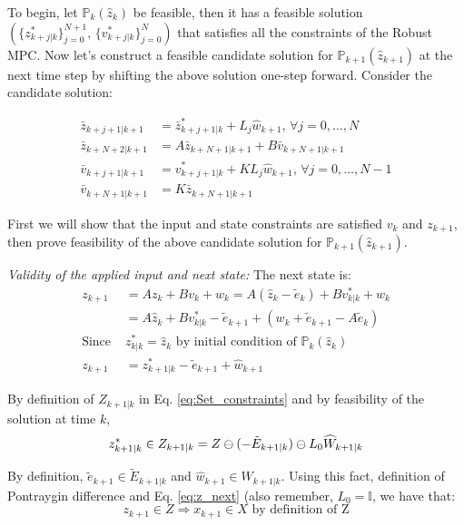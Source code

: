 To begin, let $\mathbb{P}_{k}(\hat{z}_k)$ be feasible, then it has a feasible solution $(\lbrace z^{*}_{k+j|k}\rbrace_{j=0}^{N+1}, \, \lbrace v^{*}_{k+j|k}\rbrace_{j=0}^{N} )$ that satisfies all the constraints of the Robust MPC. Now let's construct a feasible candidate solution for $\mathbb{P}_{k+1}(\hat{z}_{k+1})$ at the next time step by shifting the above solution one-step forward. Consider the candidate solution:

\begin{subequations}
\begin{align}
\label{eq:candidate}
\bar{z}_{k+j+1|k+1} &= \bar{z}^{*}_{k+j+1|k} + L_j\hat{w}_{k+1}, \, \forall j =0,\dotsc,N \\
\bar{z}_{k+N+2|k+1}&= A\bar{z}_{k+N+1|k+1} + B\bar{v}_{k+N+1|k+1} \\
\bar{v}_{k+j+1|k+1}&=v^{*}_{k+j+1|k} + KL_j\hat{w}_{k+1}, \, \forall j =0,\dotsc,N-1 \\
\bar{v}_{k+N+1|k+1}&=K\bar{z}_{k+N+1|k+1} 
\end{align}
\end{subequations}

First we will show that the input and state constraints are satisfied $v_k$ and $z_{k+1}$, then prove feasibility of the above candidate solution for $\mathbb{P}_{k+1}(\hat{z}_{k+1})$.

\textit{Validity of the applied input and next state:}
The next state is:
\begin{subequations}
\begin{align}
\label{eq:z_next}
z_{k+1} &= Az_k + Bv_k + w_k = A(\hat{z}_k-\tilde{e}_k)+Bv^{*}_{k|k}+w_k \\
 &= A\hat{z}_k+Bv^{*}_{k|k}-\tilde{e}_{k+1}+(w_k+\tilde{e}_{k+1}-A\tilde{e}_k) \\
\text{Since }& z^{*}_{k|k}=\hat{z}_k \text{ by initial condition of } \mathbb{P}_{k}(\hat{z}_k) \nonumber \\
z_{k+1}&= z^{*}_{k+1|k} - \tilde{e}_{k+1} + \hat{w}_{k+1}
\end{align}
\end{subequations}

By definition of $Z_{k+1|k}$ in Eq. \ref{eq:Set_constraints} and by feasibility of the solution at time $k$,
\begin{equation}
z^{*}_{k+1|k} \in Z_{k+1|k} = Z \ominus (-\tilde{E}_{k+1|k}) \ominus L_0\widehat{W}_{k+1|k}
\end{equation}

By definition, $\tilde{e}_{k+1} \in \tilde{E}_{k+1|k}$ and $\hat{w}_{k+1} \in  W_{k+1|k}$. Using this fact, definition of Pontraygin difference and Eq. \ref{eq:z_next} (also remember, $L_0 = \mathbb{I}$, we have that:
\begin{equation}
z_{k+1}\in Z \Rightarrow x_{k+1} \in X \text{ by definition of Z}
\end{equation}

